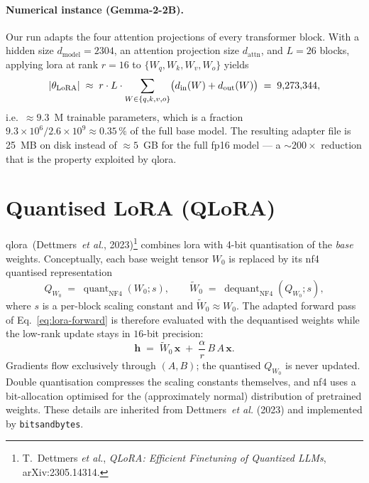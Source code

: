 \documentclass[12pt, a4paper]{report}
\DeclarePairedDelimiter{\abs}{\lvert}{\rvert}
\begin{document}
\paragraph{Numerical instance (Gemma-2-2B).} Our run adapts the four
attention projections of every transformer block. With a hidden size
\(d_{\mathrm{model}}=2304\), an attention projection size
\(d_{\mathrm{attn}}\), and \(L=26\) blocks, applying \gls{lora} at rank
\(r=16\) to \(\{W_{q}, W_{k}, W_{v}, W_{o}\}\) yields
\begin{equation}
  \abs{\theta_{\mathrm{LoRA}}}
    \;\approx\; r \cdot L \cdot \sum_{W \in \{q,k,v,o\}}
      \bigl(d_{\mathrm{in}}(W) + d_{\mathrm{out}}(W)\bigr)
    \;=\; 9{,}273{,}344,
  \label{eq:lora-count-gemma}
\end{equation}
i.e.\ \(\approx 9.3\)~M trainable parameters, which is a fraction
\(9.3 \times 10^{6} / 2.6 \times 10^{9} \approx 0.35\,\%\) of the full
base model. The resulting adapter file is 25~MB on disk instead of
\(\approx 5\)~GB for the full fp16 model --- a \(\sim\!200\!\times\)
reduction that is the property exploited by \gls{qlora}.

\section{Quantised LoRA (QLoRA)}
\label{sec:qlora}

\gls{qlora}~(Dettmers~\emph{et al.}, 2023)\footnote{T.~Dettmers \emph{et al.},
\emph{QLoRA: Efficient Finetuning of Quantized LLMs}, arXiv:2305.14314.}
combines \gls{lora} with 4-bit quantisation of the \emph{base} weights.
Conceptually, each base weight tensor \(W_0\) is replaced by its
\gls{nf4} quantised representation
\begin{equation}
  Q_{W_0} \;=\; \operatorname{quant}_{\mathrm{NF4}}(W_0; s),
  \qquad
  \widetilde{W}_0 \;=\; \operatorname{dequant}_{\mathrm{NF4}}(Q_{W_0}; s),
  \label{eq:nf4}
\end{equation}
where \(s\) is a per-block scaling constant and
\(\widetilde{W}_0 \approx W_0\). The adapted forward pass of
Eq.~\eqref{eq:lora-forward} is therefore evaluated with the dequantised
weights while the low-rank update stays in \(16\)-bit precision:
\begin{equation}
  \bm{h} \;=\; \widetilde{W}_0\,\bm{x} \;+\; \frac{\alpha}{r}\,B\,A\,\bm{x}.
  \label{eq:qlora-forward}
\end{equation}
Gradients flow exclusively through \((A, B)\); the quantised
\(Q_{W_0}\) is never updated. Double quantisation compresses the scaling
constants themselves, and \gls{nf4} uses a bit-allocation optimised for
the (approximately normal) distribution of pretrained weights. These
details are inherited from Dettmers~\emph{et al.} (2023) and
implemented by \texttt{bitsandbytes}.
\end{document}
